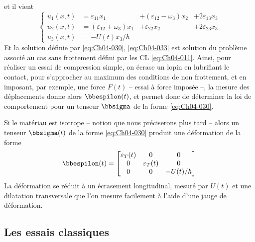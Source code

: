 et il vient
\begin{equation}
    \left\{
    \begin{aligned}
        u_1(x,t) &= \varepsilon_{11}x_1 &+ (\varepsilon_{12} - \omega_3) x_2 &+ 2\varepsilon_{13}x_3 \\
        u_2(x,t) &= (\varepsilon_{12} + \omega_3) x_1 &+ \varepsilon_{22}x_2 &+ 2\varepsilon_{23}x_3 \\
        u_3(x,t) &= -U(t) x_3/h
    \end{aligned}
    \right.
    \label{eq:Ch04-033}
\end{equation}
Et la solution définie par \eqref{eq:Ch04-030}, \eqref{eq:Ch04-033} est solution du problème associé au cas sans frottement défini par les CL \eqref{eq:Ch04-011}.
Ainsi, pour réaliser un essai de compression simple, on écrase un lopin en lubrifiant le contact, pour s'approcher au maximum des conditions de non frottement, et en imposant, par exemple, une force $F(t)$ -- essai à force imposée --, la mesure des déplacements donne alors $\bbespilon(t)$, et permet donc de déterminer la loi de comportement pour un tenseur $\bbsigma$ de la forme \eqref{eq:Ch04-030}.

Si le matériau est isotrope -- notion que nous préciserons plus tard -- alors un tenseur $\bbsigma(t)$ de la forme \eqref{eq:Ch04-030} produit une déformation de la forme
\begin{equation}
    \bbespilon (t) = 
    \begin{bmatrix}
        \varepsilon_T(t) & 0 & 0 \\
        0 & \varepsilon_T (t) & 0 \\
        0 & 0 & -U(t)/h
    \end{bmatrix}
    \label{eq:Ch04-034}
\end{equation}
La déformation se réduit à un écrasement longitudinal, mesuré par $U(t)$ et une dilatation transversale que l'on mesure facilement à l'aide d'une jauge de déformation.

\subsection{Les essais 	classiques}
\endinput
L'essai de COffipreSSlon simple est le protoc)pe ries essais homo­gÈnes. L'idée de base est de réaliser un état àe contrainte et è2 déforma­tion hOTIXJgène qui peut alors être déterminé par des mesures glo::ales cl' ef­forts et de déformation. Pour les métaux et la plupart des soliàes, l'essai de base est "l'essai de traction", oU un barreau cylindrique de longueur i et de secticn S est SOU~lS à une force 18~gitudi~ale F . L'état de ~8~­trainte et de déformation a la même forme (30), (34) que pour l'essai de compression. 
F 
':tA On mesure -la force de trac tian FU;) -l'allongement longitudinal 


